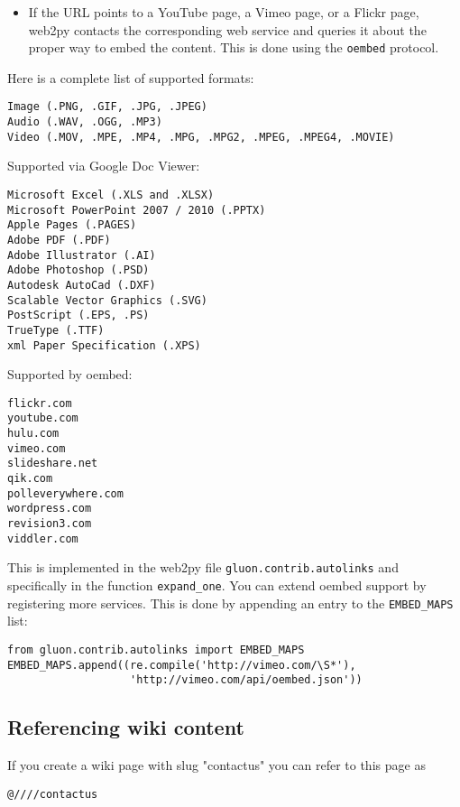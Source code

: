 \documentclass[justified,sixbynine,notoc]{tufte-book}
\def\ft{\small\tt}
\begin{document}
\begin{fullwidth}
\begin{itemize}
\item If the URL points to a YouTube page, a Vimeo page, or a Flickr page, web2py contacts the corresponding web service and queries it about the proper way to embed the content. This is done using the {\ft oembed} protocol.
\end{itemize}

Here is a complete list of supported formats:
\begin{lstlisting}
Image (.PNG, .GIF, .JPG, .JPEG)
Audio (.WAV, .OGG, .MP3)
Video (.MOV, .MPE, .MP4, .MPG, .MPG2, .MPEG, .MPEG4, .MOVIE)
\end{lstlisting}

Supported via Google Doc Viewer:

\begin{lstlisting}
Microsoft Excel (.XLS and .XLSX)
Microsoft PowerPoint 2007 / 2010 (.PPTX)
Apple Pages (.PAGES)
Adobe PDF (.PDF)
Adobe Illustrator (.AI)
Adobe Photoshop (.PSD)
Autodesk AutoCad (.DXF)
Scalable Vector Graphics (.SVG)
PostScript (.EPS, .PS)
TrueType (.TTF)
xml Paper Specification (.XPS)
\end{lstlisting}

Supported by oembed:

\begin{lstlisting}
flickr.com
youtube.com
hulu.com
vimeo.com
slideshare.net
qik.com
polleverywhere.com
wordpress.com
revision3.com
viddler.com
\end{lstlisting}

This is implemented in the web2py file {\ft gluon.contrib.autolinks} and specifically in the function {\ft expand\_one}. You can extend oembed support by registering more services. This is done by appending an entry to the {\ft EMBED\_MAPS} list:

\begin{lstlisting}
from gluon.contrib.autolinks import EMBED_MAPS
EMBED_MAPS.append((re.compile('http://vimeo.com/\S*'),
                   'http://vimeo.com/api/oembed.json'))
\end{lstlisting}

\goodbreak\subsection{Referencing wiki content}

If you create a wiki page with slug "contactus" you can refer to this page as

\begin{lstlisting}
@////contactus
\end{lstlisting}


\end{fullwidth}
\end{document}

